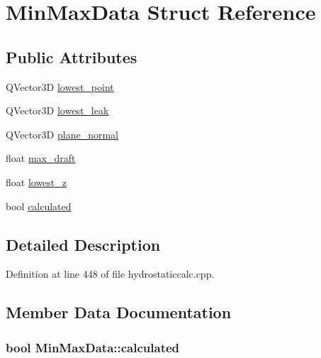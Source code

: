 \hypertarget{structMinMaxData}{\section{Min\-Max\-Data Struct Reference}
\label{structMinMaxData}
}
\subsection*{Public Attributes}
\begin{DoxyCompactItemize}
\item 
Q\-Vector3\-D \hyperlink{structMinMaxData_a3d27ad5adf37db4728e700f914bc2ab3}{lowest\-\_\-point}
\item 
Q\-Vector3\-D \hyperlink{structMinMaxData_ab422a9e59c6bb2bc9a28bbb002d5b09f}{lowest\-\_\-leak}
\item 
Q\-Vector3\-D \hyperlink{structMinMaxData_a62b4b4d97aba034731cdb0f11b23d856}{plane\-\_\-normal}
\item 
float \hyperlink{structMinMaxData_a10cf6d95b5b6d24b6b2e874e9fb05362}{max\-\_\-draft}
\item 
float \hyperlink{structMinMaxData_abe1d706394e9836f49ef8cb5dff7bd99}{lowest\-\_\-z}
\item 
bool \hyperlink{structMinMaxData_aafb5f4af5f4cbcce8f2473b85abf511c}{calculated}
\end{DoxyCompactItemize}


\subsection{Detailed Description}


Definition at line 448 of file hydrostaticcalc.\-cpp.



\subsection{Member Data Documentation}
\hypertarget{structMinMaxData_aafb5f4af5f4cbcce8f2473b85abf511c}{
\subsubsection[{calculated}]{\setlength{\rightskip}{0pt plus 5cm}bool Min\-Max\-Data\-::calculated}}\label{structMinMaxData_aafb5f4af5f4cbcce8f2473b85abf511c}


